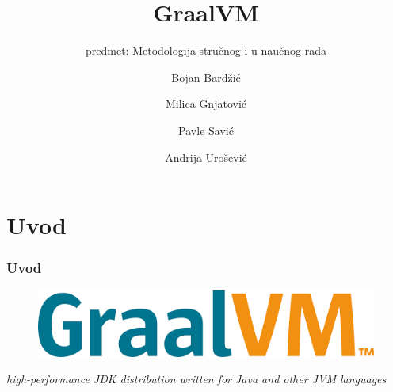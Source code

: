\documentclass{beamer}
\title{GraalVM}
\subtitle{predmet: Metodologija stručnog i u naučnog rada}
\author{Bojan Bardžić \and Milica Gnjatović \and Pavle Savić \and Andrija Urošević}
\institute{Matematički fakultet}
\date{}
\begin{document}
	
	\begin{frame}
		\titlepage
	\end{frame}
	
	\section{Uvod}
	\begin{frame}
		\frametitle{Uvod}
		
		\begin{figure}
			\begin{center}
				\includegraphics[width=0.5\linewidth]{imgs/graalvm_logo.png}	
			\end{center} 
		\end{figure}
	
		\center	
		\textit{high-performance JDK distribution written for Java and other JVM languages}


	\end{frame}
\end{document}
